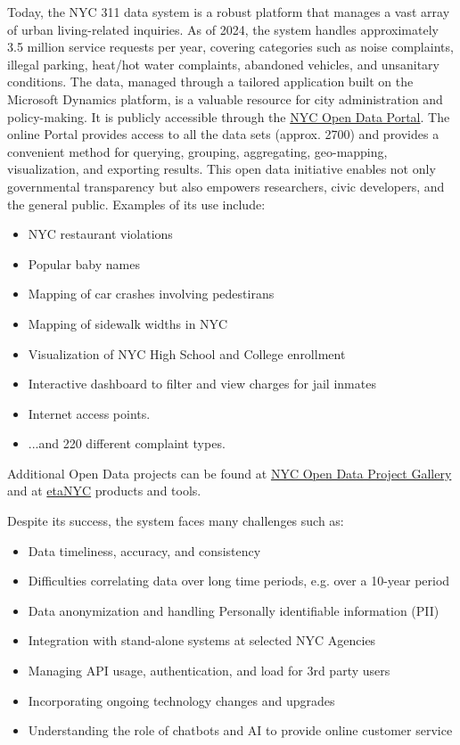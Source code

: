 \documentclass[12pt, titlepage]{article}
\begin{document}
Today, the NYC 311 data system is a robust platform that manages a
vast array of urban living-related inquiries. As of 2024, the system handles approximately 3.5 million service 
requests per year, covering categories such as noise complaints, illegal parking, heat/hot water complaints, abandoned vehicles,
and unsanitary conditions. The data, managed through a tailored application built on the Microsoft Dynamics platform, is a valuable resource for city
administration and policy-making. It is publicly accessible through the 
\href{https://opendata.cityofnewyork.us/}{NYC Open Data Portal}. The online Portal provides access
to all the data sets (approx. 2700) and provides a convenient method for querying, grouping, aggregating, geo-mapping, visualization, and exporting
results. This open data initiative enables not only governmental
transparency but also empowers researchers, civic developers, and the
general public. Examples of its use include:

\begin{itemize}
	\item NYC restaurant violations
	\item Popular baby names
	\item Mapping of car crashes involving pedestirans
	\item Mapping of sidewalk widths in NYC 
	\item Visualization of NYC High School and College enrollment
	\item Interactive dashboard to filter and view charges for jail inmates
	\item Internet access points.
	\item ...and 220 different complaint types. 
\end{itemize}

Additional Open Data projects can be found at \href{https://opendata.cityofnewyork.us/projects/}{NYC Open Data Project Gallery}
and at \href{https://beta.nyc/beta/products/}{\textbeta etaNYC} products and tools.


Despite its success, the system faces many challenges such as:
\begin{itemize}
	\item Data timeliness, accuracy, and consistency
	\item Difficulties correlating data over long time periods, e.g. over a 10-year period
	\item Data anonymization and handling Personally identifiable information (PII)
	\item Integration with stand-alone systems at selected NYC Agencies
	\item Managing API usage, authentication, and load for 3rd party users
	\item Incorporating ongoing technology changes and upgrades 
	\item Understanding the role of chatbots and AI to provide online customer service
\end{itemize}
\end{document}
